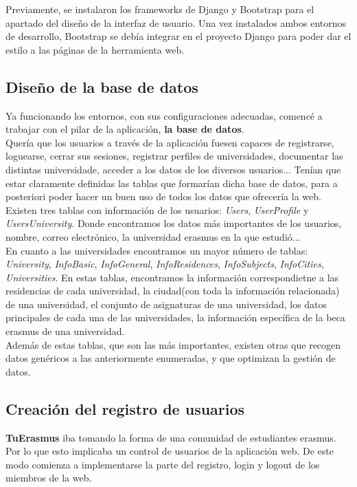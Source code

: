 Previamente, se instalaron los frameworks de Django y Bootstrap para el apartado del dise\~no de la interfaz de usuario. Una vez instalados ambos entornos de desarrollo, Bootstrap se deb\'ia integrar en el proyecto Django para poder dar el estilo a las p\'aginas de la herramienta web.\\

\subsection{Dise\~no de la base de datos}
Ya funcionando los entornos, con sus configuraciones adecuadas, comenc\'e a trabajar con el pilar de la aplicaci\'on, \textbf{la base de datos}.\\

Quer\'ia que los usuarios a trav\'es de la aplicaci\'on fuesen capaces de registrarse, loguearse, cerrar sus sesiones, registrar perfiles de universidades, documentar las distintas universidade, acceder a los datos de los diversos usuarios... Ten\'ian que estar claramente definidas las tablas que formar\'ian dicha base de datos, para a posteriori poder hacer un buen uso de todos los datos que ofrecer\'ia la web.\\

Existen tres tablas con informaci\'on de los usuarios: \textit{Users}, \textit{UserProfile} y \textit{UsersUniversity}. Donde encontramos los datos m\'as importantes de los usuarios, nombre, correo electr\'onico, la universidad erasmus en la que estudi\'o...\\

En cuanto a las universidades encontramos un mayor n\'umero de tablas: \textit{University}, \textit{InfoBasic}, \textit{InfoGeneral}, \textit{InfoResidences}, \textit{InfoSubjects}, \textit{InfoCities}, \textit{Universities}. En estas tablas, encontramos la informaci\'on correspondietne a las residencias de cada universidad, la ciudad(con toda la informaci\'on relacionada) de una universidad, el conjunto de asignaturas de una universidad, los datos principales de cada una de las universidades, la informaci\'on espec\'ifica de la beca erasmus de una universidad.\\

Adem\'as de estas tablas, que son las m\'as importantes, existen otras que recogen datos gen\'ericos a las anteriormente enumeradas, y que optimizan la gesti\'on de datos.\\

\subsection{Creaci\'on del registro de usuarios}
\textbf{TuErasmus} iba tomando la forma de una comunidad de estudiantes erasmus. Por lo que esto implicaba un control de usuarios de la aplicaci\'on web. De este modo comienza a implementarse la parte del registro, login y logout de los miembros de la web.\\

